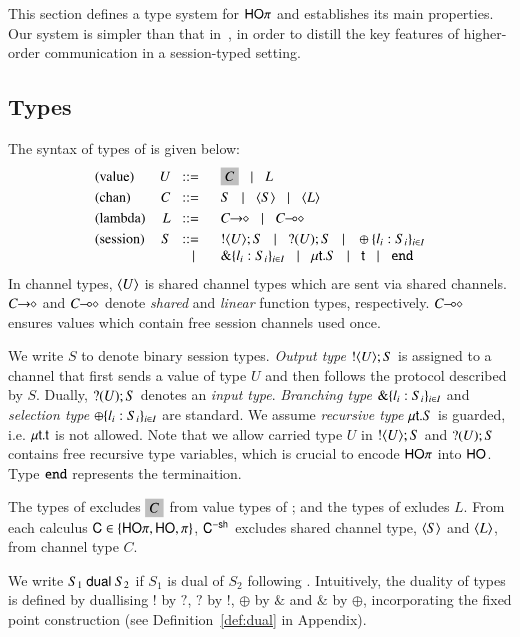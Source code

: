 This section defines a type system for
$\mathsf{HO}\pi$ and establishes its main properties. 
Our system is simpler than that in~\cite{tlca07}, in order to distill the key
features of higher-order communication in a session-typed setting.

\subsection{Types}
\label{subsec:types}
The syntax of types of \HOp is given below: 
\[
\begin{array}{lrl}
\text{(value)}	& U \bnfis &	\nonhosyntax{C} \bnfbar L\\[1mm]  %
\text{(chan)}   & C  \bnfis &	S \bnfbar \chtype{S}\bnfbar \chtype{L}
	\\[1mm]
\text{(lambda)} & L \bnfis &	\shot{C} \bnfbar \lhot{C}
	\\[1mm]
\text{(session)} &  S \bnfis & 	\btout{U} S \bnfbar \btinp{U} S 
\bnfbar \btsel{l_i:S_i}_{i \in I} \\ 
 & \bnfbar & \btbra{l_i:S_i}_{i \in I}
	  \bnfbar  \trec{t}{S} \bnfbar \vart{t}  \bnfbar \tinact
\end{array}
\]
In channel types, $\langle U \rangle$ is shared channel types 
which are sent via shared channels. 
$C\!\! \rightarrow\!\! \diamond$ and $C\!\! \multimap\!\! \diamond$ denote
{\em shared} and {\em linear} function types, respectively.
$C\!\! \multimap\!\! \diamond$ \cite{tlca07} ensures values which contain free 
session channels used once. 
 
We write $S$ to denote binary session types.  {\em Output type}
$! \langle U \rangle ; S$ is assigned to a channel that first sends a value of
type $U$ and then follows the protocol described by $S$.  Dually,
$? (U) ; S$ denotes an {\em input type}.  {\em Branching type}
$\& \{l_i:S_i\}_{i \in I}$ and {\em selection type}
$\oplus \{l_i:S_i\}_{i \in I}$ are standard.  We assume {\em recursive
  type} $\mu\mathsf{t}.S$ is guarded, i.e.  $\mu\mathsf{t}.\mathsf{t}$ is not
allowed.  Note that we allow carried type $U$ in $! \langle U \rangle ; S$ and
$? (U) ; S$ contains free recursive type variables, which is crucial
to encode $\mathsf{HO}\pi$ into $\mathsf{HO}$. Type $\mathtt{end}$ represents the
terminaition. 

The types of \HO excludes $\nonhosyntax{C}$ from 
value types of \HOp; and the types of \sessp exludes $L$. 
From each calculus $\mathsf{C} \in \{\mathsf{HO}\pi, \mathsf{HO}, \pi \}$, $\mathsf{C}^{-\mathsf{sh}}$ 
excludes shared channel type, $\langle S \rangle$ and $\langle L \rangle$, 
from channel type $C$.

We write $S_1 \ \mathsf{dual}\  S_2$ if 
$S_1$ is dual of $S_2$ following \cite{TGC14}.  
Intuitively, 
the duality of types is defined by 
duallising $!$ by $?$, $?$ by $!$, $\oplus$ by $\&$ and $\&$ by $\oplus$,  
incorporating the fixed point construction 
(see Definition~\ref{def:dual} in Appendix). 

